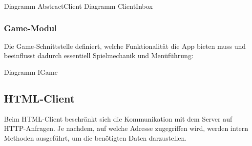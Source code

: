 Diagramm AbstractClient
Diagramm ClientInbox

\subsubsection{Game-Modul}
Die Game-Schnittstelle definiert, welche Funktionalität die App bieten muss und beeinflusst dadurch essentiell Spielmechanik und Menüführung:

Diagramm IGame

\subsection{HTML-Client}
Beim HTML-Client beschränkt sich die Kommunikation mit dem Server auf HTTP-Anfragen. Je nachdem, auf welche Adresse zugegriffen wird, werden intern Methoden ausgeführt, um die benötigten Daten darzustellen. 
